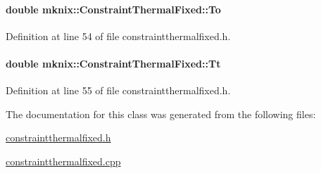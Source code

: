 \paragraph[{To}]{\setlength{\rightskip}{0pt plus 5cm}double mknix\+::\+Constraint\+Thermal\+Fixed\+::\+To\hspace{0.3cm}{\ttfamily [protected]}}\label{classmknix_1_1_constraint_thermal_fixed_a2eb0481bff8266ae4567ef147809d9cb}


Definition at line 54 of file constraintthermalfixed.\+h.

\hypertarget{classmknix_1_1_constraint_thermal_fixed_ae3d05b53ab96b8a0cbef4eb89d0da1d1}{}
\paragraph[{Tt}]{\setlength{\rightskip}{0pt plus 5cm}double mknix\+::\+Constraint\+Thermal\+Fixed\+::\+Tt\hspace{0.3cm}{\ttfamily [protected]}}\label{classmknix_1_1_constraint_thermal_fixed_ae3d05b53ab96b8a0cbef4eb89d0da1d1}


Definition at line 55 of file constraintthermalfixed.\+h.



The documentation for this class was generated from the following files\+:\begin{DoxyCompactItemize}
\item 
\hyperlink{constraintthermalfixed_8h}{constraintthermalfixed.\+h}\item 
\hyperlink{constraintthermalfixed_8cpp}{constraintthermalfixed.\+cpp}\end{DoxyCompactItemize}

